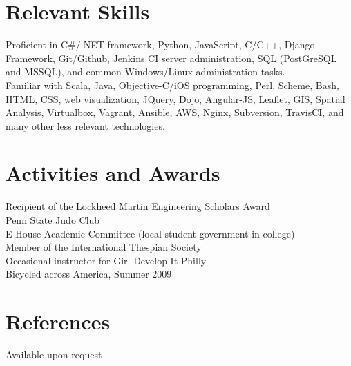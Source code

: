 \documentclass{res}
\begin{document}
\begin{resume}
\section{Relevant Skills}
Proficient in C\#/.NET framework, Python, JavaScript, C/C++, Django Framework,
Git/Github, Jenkins CI server administration, SQL (PostGreSQL and MSSQL),
and common Windows/Linux administration tasks.\\
Familiar with Scala, Java, Objective-C/iOS programming, Perl, Scheme, Bash, HTML, CSS,
web visualization, JQuery, Dojo, Angular-JS, Leaflet, GIS, Spatial Analysis,
Virtualbox, Vagrant, Ansible, AWS, Nginx, Subversion, TravisCI,
and many other less relevant technologies.
 
 
\section{Activities and Awards}          
    Recipient of the Lockheed Martin Engineering Scholars Award\\
    Penn State Judo Club\\
    E-House Academic Committee (local student government in college)\\
    Member of the International Thespian Society\\
    Occasional instructor for Girl Develop It Philly\\
    Bicycled across America, Summer 2009

\section{References}
    Available upon request
 
\end{resume}
\end{document}
